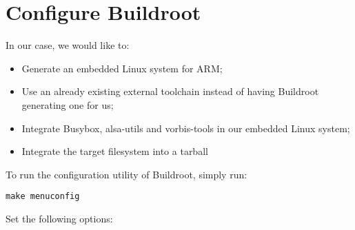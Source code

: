 \section{Configure Buildroot}

In our case, we would like to:

\begin{itemize}
\item Generate an embedded Linux system for ARM;
\item Use an already existing external toolchain instead of having
  Buildroot generating one for us;
\item Integrate Busybox, alsa-utils and vorbis-tools in our embedded
  Linux system;
\item Integrate the target filesystem into a tarball
\end{itemize}

To run the configuration utility of Buildroot, simply run:

\begin{verbatim}
make menuconfig
\end{verbatim}

Set the following options:

